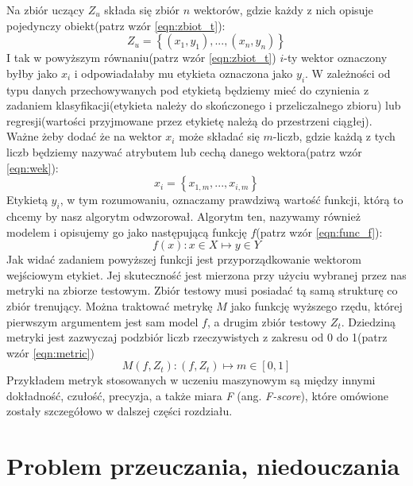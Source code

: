 Na zbiór uczący $Z_{u}$ składa się zbiór $n$ wektorów, gdzie każdy z nich opisuje pojedynczy obiekt(patrz wzór \ref{eqn:zbiot_t}):
\begin{equation}
	Z_{u}=\left \{(x_{1},y_{1}),...,(x_{n},y_{n})\right \}
	\label{eqn:zbiot_t}
\end{equation}
I tak w powyższym równaniu(patrz wzór \ref{eqn:zbiot_t}) $i$-ty wektor oznaczony byłby jako $x_{i}$ i odpowiadałaby mu etykieta oznaczona jako $y_{i}$. W zależności od typu danych przechowywanych pod etykietą będziemy mieć do czynienia z zadaniem klasyfikacji(etykieta należy do skończonego i przeliczalnego zbioru) lub regresji(wartości przyjmowane przez etykietę należą do przestrzeni ciągłej). Ważne żeby dodać że na wektor $x_{i}$ może składać się $m$-liczb, gdzie każdą z tych liczb będziemy nazywać atrybutem lub cechą danego wektora(patrz wzór \ref{eqn:wek}):
\begin{equation}
	x_{i} = \left \{ x_{1,m}, ..., x_{i,m} \right \}
	\label{eqn:wek}
\end{equation}
Etykietą $y_{i}$, w tym rozumowaniu, oznaczamy prawdziwą wartość funkcji, którą to chcemy by nasz algorytm odwzorował. Algorytm ten, nazywamy również modelem i opisujemy go jako następującą funkcję $f$(patrz wzór \ref{eqn:func_f}):
\begin{equation}
	f(x): x \in X \mapsto y \in Y
	\label{eqn:func_f}
\end{equation}
Jak widać zadaniem powyższej funkcji jest przyporządkowanie wektorom wejściowym etykiet. Jej skuteczność jest mierzona przy użyciu wybranej przez nas metryki na zbiorze testowym. Zbiór testowy musi posiadać tą samą strukturę co zbiór trenujący. Można traktować metrykę $M$ jako funkcję wyższego rzędu, której pierwszym argumentem jest sam model $f$, a drugim zbiór testowy $Z_{t}$. Dziedziną metryki jest zazwyczaj podzbiór liczb rzeczywistych z zakresu od 0 do 1(patrz wzór \ref{eqn:metric})
\begin{equation}
	M(f, Z_{t}): (f, Z_{t}) \mapsto m \in [0, 1]
	\label{eqn:metric}
\end{equation}
Przykładem metryk stosowanych w uczeniu maszynowym są między innymi dokładność, czułość, precyzja, a także miara \textit{F} (ang. \textit{F-score}), które
omówione zostały szczegółowo w dalszej części rozdziału.
\\

\section{Problem przeuczania, niedouczania}

